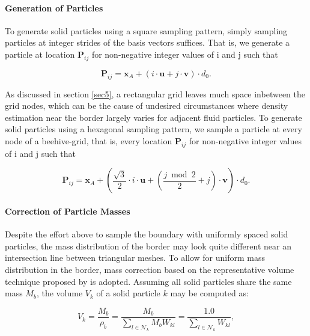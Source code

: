 \documentclass[
	11pt, 
	DIV10,
	ngerman,
	a4paper, 
	oneside, 
	headings=normal, 
	captions=tableheading,
	final, 
	numbers=noenddot
]{scrartcl}
\begin{document}
\paragraph{Generation of Particles} To generate solid particles using a square sampling pattern, simply sampling particles at integer strides of the basis vectors suffices. That is, we generate a particle at location $ \boldsymbol{P}_{ij} $ for non-negative integer values of i and j such that

\begin{equation}
	\label{eq8}
	\boldsymbol{P}_{ij} = \boldsymbol{x}_{A} + \left(i \cdot \boldsymbol{u} + j \cdot \boldsymbol{v}\right) \cdot d_{0}.
\end{equation}

As discussed in section \ref{sec5}, a rectangular grid leaves much space inbetween the grid nodes, which can be the cause of undesired circumstances where density estimation near the border largely varies for adjacent fluid particles. To generate solid particles using a hexagonal sampling pattern, we sample a particle at every node of a beehive-grid, that is, every location $ \boldsymbol{P}_{ij} $ for non-negative integer values of i and j such that

\begin{equation}
	\label{eq9}
	\boldsymbol{P}_{ij} = \boldsymbol{x}_{A} + \left(\frac{\sqrt{3}}{2} \cdot i \cdot \boldsymbol{u} + \left( \frac{j \bmod 2}{2} + j\right) \cdot \boldsymbol{v}\right) \cdot d_{0}.
\end{equation}

\paragraph{Correction of Particle Masses} Despite the effort above to sample the boundary with uniformly spaced solid particles, the mass distribution of the border may look quite different near an intersection line between triangular meshes. To allow for uniform mass distribution in the border, mass correction based on the representative volume technique proposed by \cite{akinci2012versatile} is adopted. Assuming all solid particles share the same mass $ M_{b} $, the volume $ V_{k} $ of a solid particle $ k $ may be computed as:

\begin{equation}
	\label{eq10}
    V_{k} = \frac{M_{b}}{\rho_{b}} = \frac{M_{b}}{\sum_{l \in \mathcal{N}_{k}} M_{b} W_{kl}} = \frac{1.0}{\sum_{l \in \mathcal{N}_{k}} W_{kl}},
\end{equation}
\end{document}
